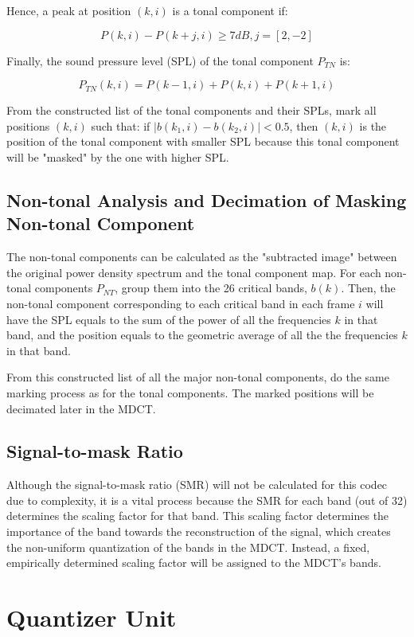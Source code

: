 \documentclass[conference]{IEEEtran}
\begin{document}
	Hence, a peak at position $(k,i)$ is a tonal component if:
	
	$$P(k,i) - P(k+j,i) \ge 7 dB, j=[2,-2]$$ 
	
	Finally, the sound pressure level (SPL) of the tonal component $P_{TN}$ is:
	
	$$P_{TN}(k,i) = P(k-1,i) + P(k,i) + P(k+1,i)$$
	
	From the constructed list of the tonal components and their SPLs, mark all positions $(k,i)$ such that: if $|b(k_1,i) - b(k_2,i)| < 0.5$, then $(k,i)$ is the position of the tonal component with smaller SPL because this tonal component will be "masked" by the one with higher SPL.
	
	\subsection{Non-tonal Analysis and Decimation of Masking Non-tonal Component}
	
	The non-tonal components can be calculated as the "subtracted image" between the original power density spectrum and the tonal component map. For each non-tonal components $P_{NT}$, group them into the 26 critical bands, $b(k)$. Then, the non-tonal component corresponding to each critical band in each frame $i$ will have the SPL equals to the sum of the power of all the frequencies $k$ in that band, and the position equals to the geometric average of all the the frequencies $k$ in that band. 
	
	From this constructed list of all the major non-tonal components, do the same marking process as for the tonal components. The marked positions will be decimated later in the MDCT.
	
	\subsection{Signal-to-mask Ratio}
	
	Although the signal-to-mask ratio (SMR) will not be calculated for this codec due to complexity, it is a vital process because the SMR for each band (out of 32) determines the scaling factor for that band. This scaling factor determines the importance of the band towards the reconstruction of the signal, which creates the non-uniform quantization of the bands in the MDCT. Instead, a fixed, empirically determined scaling factor will be assigned to the MDCT's bands.
	
	\newpage
	
	\section{Quantizer Unit}
	
\end{document}
